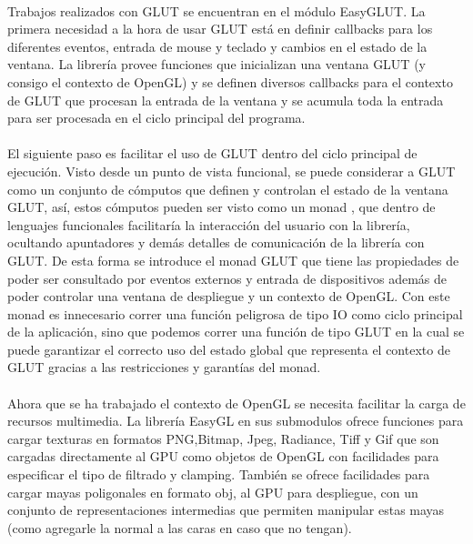 \documentclass{standalone}
\begin{document}
\paragraph{}
Trabajos realizados con GLUT se encuentran en el módulo EasyGLUT. La primera necesidad a la hora de usar GLUT está en definir callbacks para los diferentes eventos, entrada de mouse y teclado y cambios en el estado de la ventana. La librería provee funciones que inicializan una ventana GLUT (y consigo el contexto de OpenGL) y se definen diversos callbacks para el contexto de GLUT que procesan la entrada de la ventana y se acumula toda la entrada para ser procesada en el ciclo principal del programa.

\paragraph{}
El siguiente paso es facilitar el uso de GLUT dentro del ciclo principal de ejecución. Visto desde un punto de vista funcional, se puede considerar a GLUT como  un conjunto de cómputos que definen y controlan el estado de la ventana GLUT, así, estos cómputos pueden ser visto como un monad \cite{moggi1991notions} \cite{wiki:MonadsComputation} \cite{wiki:MonadsContainers}, que dentro de lenguajes funcionales facilitaría la interacción del usuario con la librería, ocultando apuntadores y demás detalles de comunicación de la librería con GLUT. De esta forma se introduce el monad GLUT que tiene las propiedades de poder ser consultado por eventos externos y entrada de dispositivos además de poder controlar una ventana de despliegue y un contexto de OpenGL. Con este monad es innecesario correr una función peligrosa de tipo IO como ciclo principal de la aplicación, sino que podemos correr una función de tipo GLUT en la cual se puede garantizar el correcto uso del estado global que representa el contexto de GLUT gracias a las restricciones y garantías del monad.

\paragraph{}
Ahora que se ha trabajado el contexto de OpenGL se necesita facilitar la carga de recursos multimedia. La librería EasyGL en sus submodulos ofrece funciones para cargar texturas en formatos PNG,Bitmap, Jpeg, Radiance, Tiff y Gif que son cargadas directamente al GPU como objetos de OpenGL con facilidades para especificar el tipo de filtrado y clamping. También se ofrece facilidades para cargar mayas poligonales en formato obj, al GPU para despliegue, con un conjunto de representaciones intermedias que permiten manipular estas mayas (como agregarle la normal a las caras en caso que no tengan).
\end{document}
